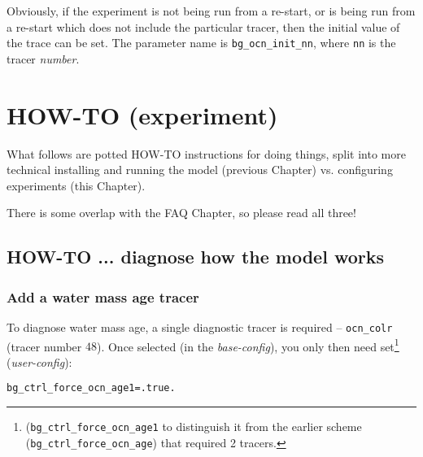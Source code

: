 \documentclass[11pt,fleqn]{book} %
\begin{document}
Obviously, if the experiment is not being run from a re-start, or is being run from a re-start which does not include the particular tracer, then the initial value of the trace can be set. The parameter name is \texttt{bg\_ocn\_init\_nn}, where \texttt{nn} is the tracer \textit{number}.


\cleardoublepage


\chapter{HOW-TO (experiment)}

\hfill \break
\vspace{24mm}

\Large
What follows are potted HOW-TO instructions for doing things, split into more technical installing and running the model (previous Chapter) vs. configuring experiments (this Chapter).
\vspace{2mm}

There is some overlap with the FAQ Chapter, so please read all three!
\normalsize


\newpage


\section{HOW-TO ... diagnose how the model works}
\vspace{2mm}

%
\subsection*{Add a water mass age tracer}
\vspace{1mm}

To diagnose water mass age, a single diagnostic tracer is required -- \texttt{ocn\_colr} (tracer number \(48\)). Once selected (in the \textit{base-config}), you only then need set\footnote{(\texttt{bg\_ctrl\_force\_ocn\_age1} to distinguish it from the earlier scheme (\texttt{bg\_ctrl\_force\_ocn\_age}) that required 2 tracers.} (\textit{user-config}):
\vspace{-2pt}\begin{verbatim}
bg_ctrl_force_ocn_age1=.true.
\end{verbatim}\vspace{-2pt}
\end{document}
